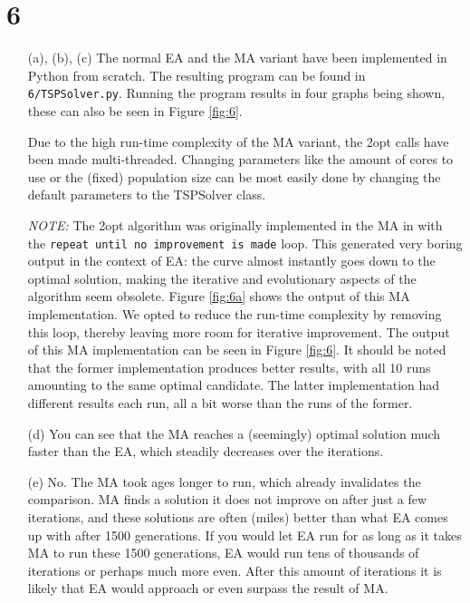 \documentclass{scrartcl}
\begin{document}
\section*{6}
\begin{itemize}
 \item[(a), (b), (c)] The normal EA and the MA variant have been implemented in Python from scratch. The resulting program can be found in \texttt{6/TSPSolver.py}. Running the program results in four graphs being shown, these can also be seen in Figure \ref{fig:6}.

 Due to the high run-time complexity of the MA variant, the 2opt calls have been made multi-threaded. Changing parameters like the amount of cores to use or the (fixed) population size can be most easily done by changing the default parameters to the TSPSolver class.

 \emph{NOTE:} The 2opt algorithm was originally implemented in the MA in with the \texttt{repeat until no improvement is made} loop. This generated very boring output in the context of EA: the curve almost instantly goes down to the optimal solution, making the iterative and evolutionary aspects of the algorithm seem obsolete. Figure \ref{fig:6a} shows the output of this MA implementation. We opted to reduce the run-time complexity by removing this loop, thereby leaving more room for iterative improvement. The output of this MA implementation can be seen in Figure \ref{fig:6}. It should be noted that the former implementation produces better results, with all 10 runs amounting to the same optimal candidate. The latter implementation had different results each run, all a bit worse than the runs of the former.

 \item[(d)] You can see that the MA reaches a (seemingly) optimal solution much faster than the EA, which steadily decreases over the iterations.

 \item[(e)] No. The MA took ages longer to run, which already invalidates the comparison. MA finds a solution it does not improve on after just a few iterations, and these solutions are often (miles) better than what EA comes up with after 1500 generations. If you would let EA run for as long as it takes MA to run these 1500 generations, EA would run tens of thousands of iterations or perhaps much more even. After this amount of iterations it is likely that EA would approach or even surpass the result of MA.


\end{itemize}
\end{document}
